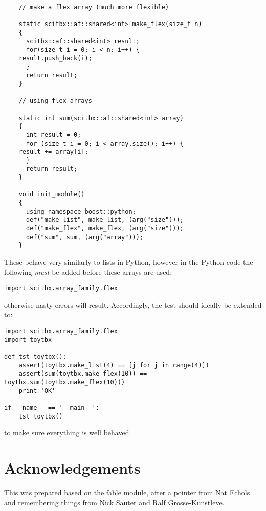 \documentclass[a4paper, 11pt]{article}
\begin{document}
{\small
\begin{verbatim}
    // make a flex array (much more flexible)

    static scitbx::af::shared<int> make_flex(size_t n)
    {
      scitbx::af::shared<int> result;
      for(size_t i = 0; i < n; i++) {
	result.push_back(i);
      }
      return result;
    }

    // using flex arrays

    static int sum(scitbx::af::shared<int> array)
    {
      int result = 0;
      for (size_t i = 0; i < array.size(); i++) {
	result += array[i];
      }
      return result;
    }

    void init_module()
    {
      using namespace boost::python;
      def("make_list", make_list, (arg("size")));
      def("make_flex", make_flex, (arg("size")));
      def("sum", sum, (arg("array")));
    }
\end{verbatim}
}

These behave very similarly to lists in Python, however in the Python
code the following \emph{must} be added before these arrays are used:

{\small
\begin{verbatim}
import scitbx.array_family.flex
\end{verbatim}
}

\noindent
otherwise nasty errors will result. Accordingly, the test should
ideally be extended to:

{\small
\begin{verbatim}
import scitbx.array_family.flex
import toytbx

def tst_toytbx():
    assert(toytbx.make_list(4) == [j for j in range(4)])
    assert(sum(toytbx.make_flex(10)) == toytbx.sum(toytbx.make_flex(10)))
    print 'OK'

if __name__ == '__main__':
    tst_toytbx()
\end{verbatim}
} 

\noindent
to make sure everything is well behaved.

\section{Acknowledgements}

This was prepared based on the fable module, after a pointer from Nat Echols and remembering things from Nick Sauter and Ralf Grosse-Kunstleve.
\end{document}
